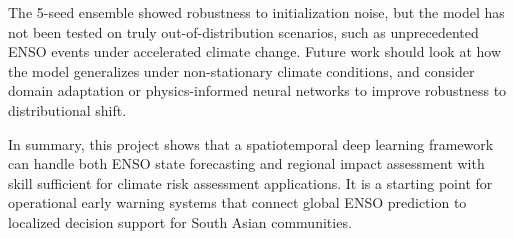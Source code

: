 The 5-seed ensemble showed robustness to initialization noise, but the model has not been tested on truly out-of-distribution scenarios, such as unprecedented ENSO events under accelerated climate change. Future work should look at how the model generalizes under non-stationary climate conditions, and consider domain adaptation or physics-informed neural networks to improve robustness to distributional shift.

In summary, this project shows that a spatiotemporal deep learning framework can handle both ENSO state forecasting and regional impact assessment with skill sufficient for climate risk assessment applications. It is a starting point for operational early warning systems that connect global ENSO prediction to localized decision support for South Asian communities.
